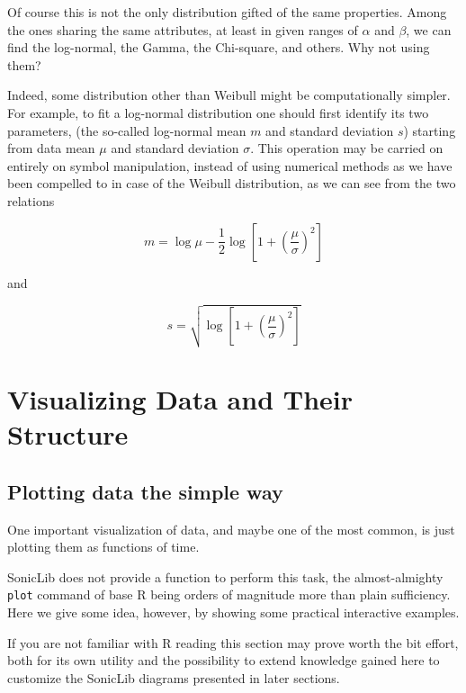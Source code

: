 \documentclass[a4paper,10pt]{book}
\begin{document}
Of course this is not the only distribution gifted of the same properties. Among the ones sharing the same attributes, at least in given ranges of $ \alpha $ and $ \beta $, we can find the log-normal, the Gamma, the Chi-square, and others. Why not using them?

Indeed, some distribution other than Weibull might be computationally simpler. For example, to fit a log-normal distribution one should first identify its two parameters, (the so-called log-normal mean $m$ and standard deviation $s$) starting from data mean $\mu$ and standard deviation $\sigma$. This operation may be carried on entirely on symbol manipulation, instead of using numerical methods as we have been compelled to in case of the Weibull distribution, as we can see from the two relations

\begin{equation}\label{eq:Lognormal mean}
	m = \log \mu - \frac{1}{2}\log \left[1 + \left(\frac{\mu}{\sigma}\right)^{2} \right]
\end{equation}

\noindent and

\begin{equation}\label{eq:Lognormal standard deviation}
	s = \sqrt{\log \left[1 + \left(\frac{\mu}{\sigma}\right)^{2} \right]}
\end{equation}



\chapter{Visualizing Data and Their Structure}
\section{Plotting data the simple way}

One important visualization of data, and maybe one of the most common, is just plotting them as functions of time.

SonicLib does not provide a function to perform this task, the almost-almighty \verb|plot| command of base R being orders of magnitude more than plain sufficiency. Here we give some idea, however, by showing some practical interactive examples.

If you are not familiar with R reading this section may prove worth the bit effort, both for its own utility and the possibility to extend knowledge gained here to customize the SonicLib diagrams presented in later sections.
\end{document}
